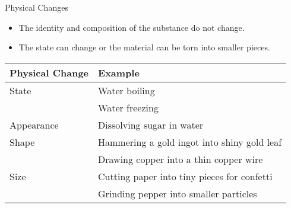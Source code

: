 \documentclass[11pt,letterpaper]{article}
\begin{document}
\begin{frame}{Physical Changes}
	\begin{itemize}
		\item The identity and composition of the substance do not
			change.
		\item The state can change or the material can be torn into
			smaller pieces.
	\end{itemize}

	\bigskip

	\begin{small}
	\begin{tabularx}{\linewidth}
		{l
		>{\raggedright\arraybackslash}X}
		\toprule
		\bfseries Physical Change & \bfseries Example \\
		\midrule
		State & Water boiling \\
		& Water freezing \\
		Appearance & Dissolving sugar in water \\
		Shape & Hammering a gold ingot into shiny gold leaf \\
		& Drawing copper into a thin copper wire \\
		Size & Cutting paper into tiny pieces for confetti \\
		& Grinding pepper into smaller particles \\
		\bottomrule
	\end{tabularx}
	\end{small}

%
\end{frame}


\end{document}
